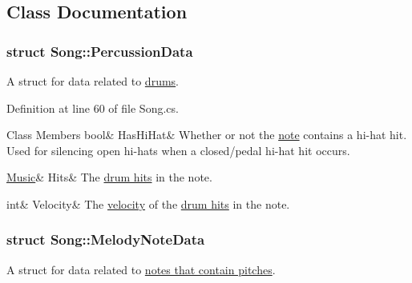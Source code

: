 \subsection{Class Documentation}
\label{struct_song_1_1_percussion_data}
\subsubsection{struct Song\+:\+:Percussion\+Data}
A struct for data related to \hyperlink{group___music_structs_struct_music_1_1_percussion_note}{drums}. 

Definition at line 60 of file Song.\+cs.

\begin{DoxyFields}{Class Members}
\mbox{\label{group___song_structs_a0487a8cb56e5454ea46c9c42e55033eb}} 
bool&
HasHiHat&
Whether or not the \hyperlink{group___music_structs_struct_music_1_1_percussion_note}{note} contains a hi-\/hat hit. Used for silencing open hi-\/hats when a closed/pedal hi-\/hat hit occurs. \\
\hline

\mbox{\label{group___song_structs_ac8a09dee6f5d73d31bd91e5df71d65ff}} 
\hyperlink{class_music}{Music}&
Hits&
The \hyperlink{group___music_structs_a11ba5b49d8ee25941337573029660f25}{drum hits} in the note. \\
\hline

\mbox{\label{group___song_structs_ad3e20aaef3edeeb78a01522adb218797}} 
int&
Velocity&
The \hyperlink{group___audio_DefVel}{velocity} of the \hyperlink{group___music_structs_a11ba5b49d8ee25941337573029660f25}{drum hits} in the note. \\
\hline

\end{DoxyFields}
\label{struct_song_1_1_melody_note_data}
\subsubsection{struct Song\+:\+:Melody\+Note\+Data}
A struct for data related to \hyperlink{group___music_structs_struct_music_1_1_melody_note}{notes that contain pitches}. 

